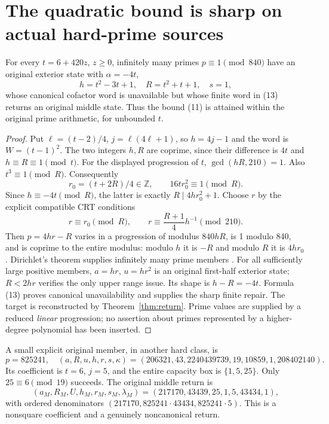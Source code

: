\section{The quadratic bound is sharp on actual hard-prime sources}
\begin{theorem}\label{thm:sharp}
For every $t=6+420z$, $z\ge0$, infinitely many primes $p\equiv1\pmod{840}$ have
an original exterior state with $\alpha=-4t$,
\[
 h=t^2-3t+1,\quad R=t^2+t+1,\quad s=1,
\]
whose canonical cofactor word is unavailable but whose finite word in (13)
returns an original middle state. Thus the bound (11) is attained within the
original prime arithmetic, for unbounded $t$.
\end{theorem}
\begin{proof}
Put $\ell=(t-2)/4$, $j=\ell(4\ell+1)$, so $h=4j-1$ and the word is
$W=(t-1)^2$. The two integers $h,R$ are coprime, since their difference is $4t$
and $h\equiv R\equiv1\pmod t$. For the displayed progression of $t$,
$\gcd(hR,210)=1$. Also $t^3\equiv1\pmod R$. Consequently
\[
 r_0=(t+2R)/4\in\mathbb Z,
 \qquad16tr_0^2\equiv1\pmod R.
\]
Since $h\equiv-4t\pmod R$, the latter is exactly
$R\mid4hr_0^2+1$.
Choose $r$ by the explicit compatible CRT conditions
\[
 r\equiv r_0\pmod R,\qquad
 r\equiv\frac{R+1}{4}h^{-1}\pmod{210}.
\]
Then $p=4hr-R$ varies in a progression of modulus $840hR$, is 1 modulo 840,
and is coprime to the entire modulus: modulo $h$ it is $-R$ and modulo $R$
it is $4hr_0$. Dirichlet's theorem supplies infinitely many prime members
\cite[Theorem 18.1]{Dirichlet}. For all sufficiently large positive members,
$a=hr$, $u=hr^2$ is an original first-half exterior state; $R<2hr$ verifies the
 only upper range issue. Its shape is $h-R=-4t$. Formula (13) proves canonical
 unavailability and supplies the sharp finite repair. The target is reconstructed by
Theorem~\ref{thm:return}. Prime values are supplied by a reduced \emph{linear}
progression; no assertion about primes represented by a higher-degree polynomial
has been inserted.
\end{proof}

A small explicit original member, in another hard class, is
\[
 \boxed{p=825241,\quad
 (a,R,u,h,r,s,\kappa)=(206321,43,2240439739,19,10859,1,208402140).}    \tag{17}
\]
Its coefficient is $t=6$, $j=5$, and the entire capacity box is $\{1,5,25\}$.
Only $25\equiv6\pmod{19}$ succeeds. The original middle return is
\[
 (a_M,R_M,U,h_M,r_M,s_M,\lambda_M)
 =(217170,43439,25,1,5,43434,1),                           \tag{18}
\]
with ordered denominators $(217170,825241\cdot43434,825241\cdot5)$.
This is a nonsquare coefficient and a genuinely noncanonical return.

